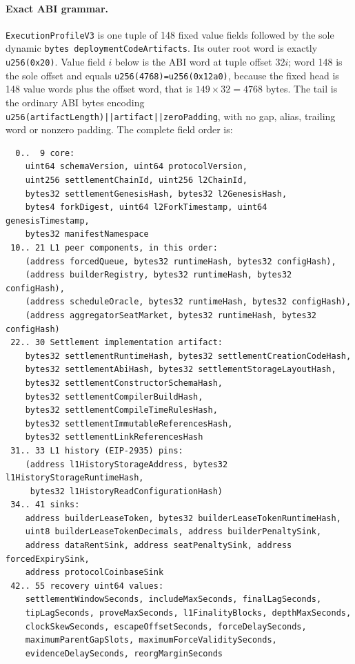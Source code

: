 \documentclass[a4paper,11pt]{article}
\newcommand{\code}[1]{\nolinkurl{#1}}
\begin{document}
\paragraph{Exact ABI grammar.}
\code{ExecutionProfileV3} is one tuple of 148 fixed value fields followed by
the sole dynamic \code{bytes deploymentCodeArtifacts}.  Its outer root word is
exactly \code{u256(0x20)}.  Value field \(i\) below is the ABI word at tuple
offset \(32i\); word 148 is the sole offset and equals
\code{u256(4768)=u256(0x12a0)}, because the fixed head is 148 value words plus
the offset word, that is \(149\times32=4768\) bytes.  The tail is the ordinary
ABI bytes encoding \code{u256(artifactLength)||artifact||zeroPadding}, with no
gap, alias, trailing word or nonzero padding.  The complete field order is:
\begin{verbatim}
  0..  9 core:
    uint64 schemaVersion, uint64 protocolVersion,
    uint256 settlementChainId, uint256 l2ChainId,
    bytes32 settlementGenesisHash, bytes32 l2GenesisHash,
    bytes4 forkDigest, uint64 l2ForkTimestamp, uint64 genesisTimestamp,
    bytes32 manifestNamespace
 10.. 21 L1 peer components, in this order:
    (address forcedQueue, bytes32 runtimeHash, bytes32 configHash),
    (address builderRegistry, bytes32 runtimeHash, bytes32 configHash),
    (address scheduleOracle, bytes32 runtimeHash, bytes32 configHash),
    (address aggregatorSeatMarket, bytes32 runtimeHash, bytes32 configHash)
 22.. 30 Settlement implementation artifact:
    bytes32 settlementRuntimeHash, bytes32 settlementCreationCodeHash,
    bytes32 settlementAbiHash, bytes32 settlementStorageLayoutHash,
    bytes32 settlementConstructorSchemaHash,
    bytes32 settlementCompilerBuildHash,
    bytes32 settlementCompileTimeRulesHash,
    bytes32 settlementImmutableReferencesHash,
    bytes32 settlementLinkReferencesHash
 31.. 33 L1 history (EIP-2935) pins:
    (address l1HistoryStorageAddress, bytes32 l1HistoryStorageRuntimeHash,
     bytes32 l1HistoryReadConfigurationHash)
 34.. 41 sinks:
    address builderLeaseToken, bytes32 builderLeaseTokenRuntimeHash,
    uint8 builderLeaseTokenDecimals, address builderPenaltySink,
    address dataRentSink, address seatPenaltySink, address forcedExpirySink,
    address protocolCoinbaseSink
 42.. 55 recovery uint64 values:
    settlementWindowSeconds, includeMaxSeconds, finalLagSeconds,
    tipLagSeconds, proveMaxSeconds, l1FinalityBlocks, depthMaxSeconds,
    clockSkewSeconds, escapeOffsetSeconds, forceDelaySeconds,
    maximumParentGapSlots, maximumForceValiditySeconds,
    evidenceDelaySeconds, reorgMarginSeconds

\end{verbatim}
\end{document}
